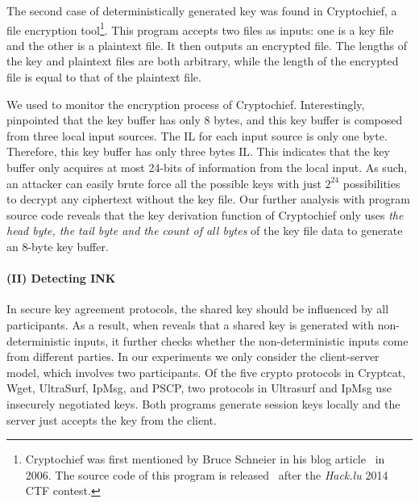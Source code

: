


The second case of deterministically generated key was found in \textsf{\small Cryptochief}, a file encryption tool\footnote{Cryptochief was first mentioned by Bruce Schneier in his blog article~\cite{krypto} in 2006. The source code of this program is released~\cite{cryptochief_cryptozoo} after the \emph{Hack.lu} 2014 CTF contest.}. This program accepts two files as inputs: one is a key file and the other is a plaintext file. It then outputs an encrypted file. The lengths of the key and plaintext files are both arbitrary, while the length of the encrypted file is equal to that of the plaintext file.

We used \sysname to monitor the encryption process of \textsf{\small Cryptochief}. Interestingly, \sysname pinpointed that the key buffer has only 8 bytes, and this key buffer is composed from three local input sources.  The IL for each input source is only one byte. 
Therefore, this key buffer has only three bytes IL. This indicates that the key buffer only acquires at most 24-bits of information from the local input. As such, an attacker can easily brute force all the possible keys with just $2^{24}$ possibilities to decrypt any ciphertext without the key file. Our further analysis with program source code reveals that the key derivation function of \textsf{\small Cryptochief} only uses \emph{the head byte, the tail byte and the count of all bytes} of the key  file data to generate an 8-byte key buffer.


\paragraph{{\bf (II) Detecting INK}}\label{sec:eval:keyagaree}
In secure key agreement protocols, the shared key should be influenced by all participants. 
As a result, when \sysname reveals that a shared key is generated with non-deterministic inputs, it further checks whether the non-deterministic inputs come from different parties. 
In our experiments we only consider the client-server model, which involves two participants. 
Of the five crypto protocols in \textsf{\small Cryptcat, Wget, UltraSurf, IpMsg, and PSCP}, two protocols in \textsf{\small Ultrasurf} and \textsf{\small IpMsg} use insecurely negotiated keys. 
Both programs generate session keys locally and the server just accepts the key from the client. 

